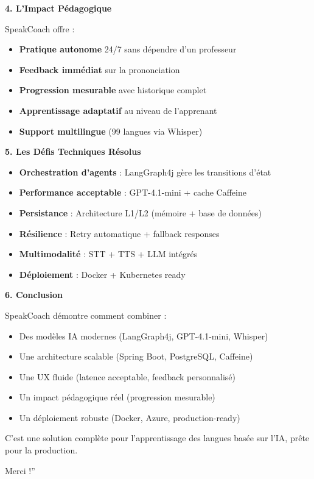 \documentclass[12pt,a4paper,oneside]{report}
\begin{document}
\begin{tcolorbox}[colback=darkblue!10, colframe=darkblue, title=\textbf{SCRIPT DE CONCLUSION}]
\textbf{4. L'Impact Pédagogique}

SpeakCoach offre :
\begin{itemize}
    \item \textbf{Pratique autonome} 24/7 sans dépendre d'un professeur
    \item \textbf{Feedback immédiat} sur la prononciation
    \item \textbf{Progression mesurable} avec historique complet
    \item \textbf{Apprentissage adaptatif} au niveau de l'apprenant
    \item \textbf{Support multilingue} (99 langues via Whisper)
\end{itemize}

\textbf{5. Les Défis Techniques Résolus}

\begin{itemize}
    \item \textbf{Orchestration d'agents} : LangGraph4j gère les transitions d'état
    \item \textbf{Performance acceptable} : GPT-4.1-mini + cache Caffeine
    \item \textbf{Persistance} : Architecture L1/L2 (mémoire + base de données)
    \item \textbf{Résilience} : Retry automatique + fallback responses
    \item \textbf{Multimodalité} : STT + TTS + LLM intégrés
    \item \textbf{Déploiement} : Docker + Kubernetes ready
\end{itemize}

\textbf{6. Conclusion}

SpeakCoach démontre comment combiner :
\begin{itemize}
    \item Des modèles IA modernes (LangGraph4j, GPT-4.1-mini, Whisper)
    \item Une architecture scalable (Spring Boot, PostgreSQL, Caffeine)
    \item Une UX fluide (latence acceptable, feedback personnalisé)
    \item Un impact pédagogique réel (progression mesurable)
    \item Un déploiement robuste (Docker, Azure, production-ready)
\end{itemize}

C'est une solution complète pour l'apprentissage des langues basée sur l'IA, 
prête pour la production.

Merci !''

\end{tcolorbox}
\end{document}
